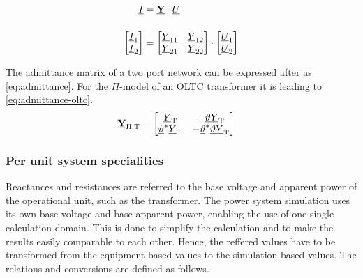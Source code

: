 \begin{align}
    \underline{I}&=\underline{\mathrm{\textbf{Y}}} \cdot \underline{U} \notag \\[12pt]
    \begin{bmatrix}
        \underline{I}_1 \\
        \underline{I}_2
    \end{bmatrix}&= 
    \begin{bmatrix}
        \underline{Y}_{11} & \underline{Y}_{12} \\
        \underline{Y}_{21} & \underline{Y}_{22}
    \end{bmatrix} \cdot
    \begin{bmatrix}
        \underline{U}_1 \\
        \underline{U}_2
    \end{bmatrix} \label{eq:admittance}
\end{align}

The admittance matrix of a two port network can be expressed after \textcite{machowskiPowerSystemDynamics2020} as \autoref{eq:admittance}. For the $\Pi$-model of an \acs{OLTC} transformer it is leading to \autoref{eq:admittance-oltc}.
\begin{align}
    \underline{\mathrm{\textbf{Y}}}_\mathrm{\Pi,T}&= 
    \begin{bmatrix}
        \underline{Y}_\mathrm{T} & -\underline{\vartheta}\underline{Y}_\mathrm{T} \\
        \underline{\vartheta}^*\underline{Y}_\mathrm{T} & -\underline{\vartheta}^*\underline{\vartheta}\underline{Y}_\mathrm{T}
    \end{bmatrix} \label{eq:admittance-oltc}
\end{align}

\subsubsection*{Per unit system specialities}

Reactances and resistances are referred to the base voltage and apparent power of the operational unit, such as the transformer. The power system simulation uses its own base voltage and base apparent power, enabling the use of one single calculation domain. This is done to simplify the calculation and to make the results easily comparable to each other. Hence, the reffered values have to be transformed from the equipment based values to the simulation based values. The relations and conversions are defined as follows.

